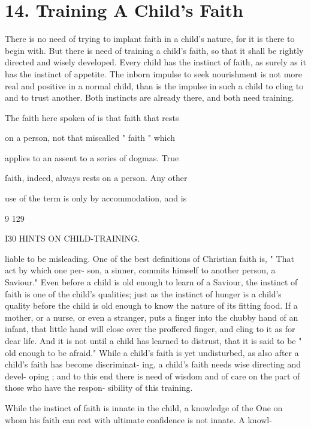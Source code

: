 \documentclass[
]{book}
\begin{document}
\hypertarget{training-a-childs-faith}{%
\chapter{14. Training A Child's Faith}\label{training-a-childs-faith}}

There is no need of trying to implant faith in a child's nature, for it is there to begin with. But there is need of training a child's faith, so that it shall be rightly directed and wisely developed. Every child has the instinct of faith, as surely as it has the instinct of appetite. The inborn impulse to seek nourishment is not more real and positive in a normal child, than is the impulse in such a child to cling to and to trust another. Both instincts are already there, and both need training.

The faith here spoken of is that faith that rests

on a person, not that miscalled " faith " which

applies to an assent to a series of dogmas. True

faith, indeed, always rests on a person. Any other

use of the term is only by accommodation, and is

9 129

I30 HINTS ON CHILD-TRAINING.

liable to be misleading. One of the best definitions of Christian faith is, " That act by which one per- son, a sinner, commits himself to another person, a Saviour." Even before a child is old enough to learn of a Saviour, the instinct of faith is one of the child's qualities; just as the instinct of hunger is a child's quality before the child is old enough to know the nature of its fitting food. If a mother, or a nurse, or even a stranger, puts a finger into the chubby hand of an infant, that little hand will close over the proffered finger, and cling to it as for dear life. And it is not until a child has learned to distrust, that it is said to be " old enough to be afraid." While a child's faith is yet undisturbed, as also after a child's faith has become discriminat- ing, a child's faith needs wise directing and devel- oping ; and to this end there is need of wisdom and of care on the part of those who have the respon- sibility of this training.

While the instinct of faith is innate in the child, a knowledge of the One on whom his faith can rest with ultimate confidence is not innate. A knowl-
\end{document}
